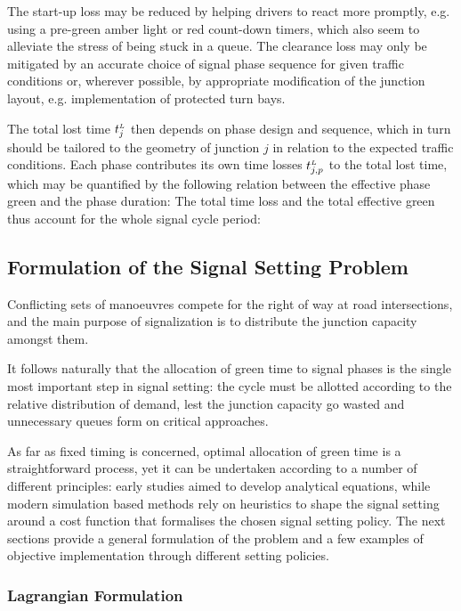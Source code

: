 The start-up loss may be reduced by helping drivers to react more promptly, e.g. using a pre-green amber light or red count-down timers, which also seem to alleviate the stress of being stuck in a queue.
The clearance loss may only be mitigated by an accurate choice of signal phase sequence for given traffic conditions or, wherever possible, by appropriate modification of the junction layout, e.g. implementation of protected turn bays.

The total lost time $t_{j}^{\scriptscriptstyle{L}}$ then depends on phase design and sequence, which in turn should
be tailored to the geometry of junction $j$ in relation to the expected traffic conditions.
Each phase contributes its own time losses $t_{j,p}^{\scriptscriptstyle{L}}$ to the total lost time, which may be
quantified by the following relation between the effective phase green and the phase duration:
The total time loss and the total effective green thus account for the whole signal cycle period:


\subsection{Formulation of the Signal Setting Problem}
Conflicting sets of manoeuvres compete for the right of way at road intersections, and the
main purpose of signalization is to distribute the junction capacity amongst them.

It follows naturally that the allocation of green time to signal phases is the single most important step in signal setting: the cycle must be allotted according to the relative distribution of demand,
lest the junction capacity go wasted and unnecessary queues form on critical approaches.

As far as fixed timing is concerned, optimal allocation of green time is a straightforward
process, yet it can be undertaken according to a number of different principles: early studies
aimed to develop analytical equations, while modern simulation based methods rely on
heuristics to shape the signal setting around a cost function that formalises the chosen signal
setting policy. The next sections provide a general formulation of the problem and a few examples of objective implementation through different setting policies.

\subsubsection*{Lagrangian Formulation}

